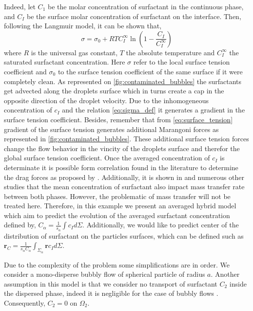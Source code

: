 Indeed, let $C_1$ be the molar concentration of surfactant in the continuous phase, and $C_I$ be the surface molar concentration of surfactant on the interface. 
Then, following the Langmuir model, it can be shown that, 
\begin{equation}
    \sigma
    = \sigma_0
    + RT C_I^\infty
    \ln\left(1-\frac{C_I}{C_I^\infty}\right)
    \label{eq:sigma_def}
\end{equation}
where $R$ is the universal gas constant, $T$ the absolute temperature and $C_I^\infty$ the saturated surfactant concentration.
Here $\sigma$ refer to the local surface tension coefficient and $\sigma_0$ to the surface tension coefficient of the same surface if it were completely clean. 
As represented on \ref{fig:contaminated_bubbles} the surfactants get advected along the droplets surface which in turns create a cap in the opposite direction of the droplet velocity. 
Due to the inhomogeneous concentration of $c_I$ and the relation \ref{eq:sigma_def} it generates a gradient in the surface tension coefficient. 
Besides, remember that from \ref{eq:surface_tension} gradient of the surface tension generates additional Marangoni forces as represented in \ref{fig:contaminated_bubbles}. 
These additional surface tension forces change the flow behavior in the vincity of the droplets surface and therefor the global surface tension coefficient. 
Once the averaged concentration of  $c_I$ is determinate it is possible form correlation found in the literature to determine the drag forces as proposed by \citet{kentheswaran2022direct}. 
Additionally, it is shown in \citet{kentheswaran2022direct} and numerous other studies that the mean concentration of surfactant also impact mass transfer rate between both phases. 
However, the problematic of mass transfer will not be treated here. 
Therefore, in this example we present an averaged hybrid model which aim to predict the evolution of the averaged surfactant concentration defined by, $C_{\alpha}= \frac{1}{s_\alpha}\int c_I d\Sigma$.
Additionally, we would like to predict center of the distribution of surfactant on the particles surfaces, which can be defined such as $\textbf{r}_C = \frac{1}{s_\alpha C_\alpha}\int_{\Sigma_\alpha} \textbf{r}c_Id\Sigma$. 

Due to the complexity of the problem some simplifications are in order. 
We consider a mono-disperse bubbly flow of spherical particle of radius $a$. 
Another assumption in this model is that we consider no transport of surfactant $C_2$ inside the dispersed phase, indeed it is negligible for the case of bubbly flows \citep{kentheswaran2022direct}. 
Consequently, $C_2 =0$ on $\Omega_2$.



